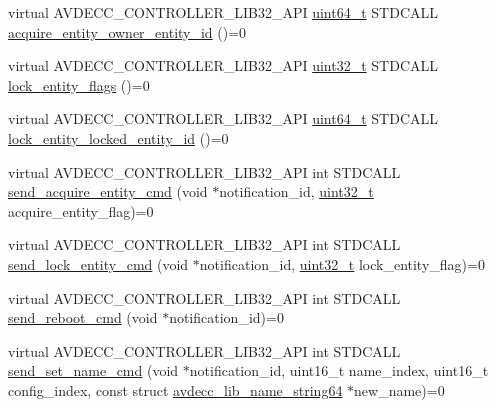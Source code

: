 \begin{DoxyCompactItemize}
\item 
virtual A\+V\+D\+E\+C\+C\+\_\+\+C\+O\+N\+T\+R\+O\+L\+L\+E\+R\+\_\+\+L\+I\+B32\+\_\+\+A\+PI \hyperlink{parse_8c_aec6fcb673ff035718c238c8c9d544c47}{uint64\+\_\+t} S\+T\+D\+C\+A\+LL \hyperlink{classavdecc__lib_1_1descriptor__base_a6480d803970d505ce7a9b429a6eb71bd}{acquire\+\_\+entity\+\_\+owner\+\_\+entity\+\_\+id} ()=0
\item 
virtual A\+V\+D\+E\+C\+C\+\_\+\+C\+O\+N\+T\+R\+O\+L\+L\+E\+R\+\_\+\+L\+I\+B32\+\_\+\+A\+PI \hyperlink{parse_8c_a6eb1e68cc391dd753bc8ce896dbb8315}{uint32\+\_\+t} S\+T\+D\+C\+A\+LL \hyperlink{classavdecc__lib_1_1descriptor__base_a757e66272bba4c52cefa914df8c60bb5}{lock\+\_\+entity\+\_\+flags} ()=0
\item 
virtual A\+V\+D\+E\+C\+C\+\_\+\+C\+O\+N\+T\+R\+O\+L\+L\+E\+R\+\_\+\+L\+I\+B32\+\_\+\+A\+PI \hyperlink{parse_8c_aec6fcb673ff035718c238c8c9d544c47}{uint64\+\_\+t} S\+T\+D\+C\+A\+LL \hyperlink{classavdecc__lib_1_1descriptor__base_a052b47529d0e60ca87894159fcb65e14}{lock\+\_\+entity\+\_\+locked\+\_\+entity\+\_\+id} ()=0
\item 
virtual A\+V\+D\+E\+C\+C\+\_\+\+C\+O\+N\+T\+R\+O\+L\+L\+E\+R\+\_\+\+L\+I\+B32\+\_\+\+A\+PI int S\+T\+D\+C\+A\+LL \hyperlink{classavdecc__lib_1_1descriptor__base_adfd0cf2a51bff7d762b0efc743480c48}{send\+\_\+acquire\+\_\+entity\+\_\+cmd} (void $\ast$notification\+\_\+id, \hyperlink{parse_8c_a6eb1e68cc391dd753bc8ce896dbb8315}{uint32\+\_\+t} acquire\+\_\+entity\+\_\+flag)=0
\item 
virtual A\+V\+D\+E\+C\+C\+\_\+\+C\+O\+N\+T\+R\+O\+L\+L\+E\+R\+\_\+\+L\+I\+B32\+\_\+\+A\+PI int S\+T\+D\+C\+A\+LL \hyperlink{classavdecc__lib_1_1descriptor__base_a1ac1f5c700f4eebd37b7c45498b36bbc}{send\+\_\+lock\+\_\+entity\+\_\+cmd} (void $\ast$notification\+\_\+id, \hyperlink{parse_8c_a6eb1e68cc391dd753bc8ce896dbb8315}{uint32\+\_\+t} lock\+\_\+entity\+\_\+flag)=0
\item 
virtual A\+V\+D\+E\+C\+C\+\_\+\+C\+O\+N\+T\+R\+O\+L\+L\+E\+R\+\_\+\+L\+I\+B32\+\_\+\+A\+PI int S\+T\+D\+C\+A\+LL \hyperlink{classavdecc__lib_1_1descriptor__base_a1618412a9b3d57a12044030b31cfd5a3}{send\+\_\+reboot\+\_\+cmd} (void $\ast$notification\+\_\+id)=0
\item 
virtual A\+V\+D\+E\+C\+C\+\_\+\+C\+O\+N\+T\+R\+O\+L\+L\+E\+R\+\_\+\+L\+I\+B32\+\_\+\+A\+PI int S\+T\+D\+C\+A\+LL \hyperlink{classavdecc__lib_1_1descriptor__base_a6a8c227d7a202f251c689107df7ede0b}{send\+\_\+set\+\_\+name\+\_\+cmd} (void $\ast$notification\+\_\+id, uint16\+\_\+t name\+\_\+index, uint16\+\_\+t config\+\_\+index, const struct \hyperlink{structavdecc__lib_1_1avdecc__lib__name__string64}{avdecc\+\_\+lib\+\_\+name\+\_\+string64} $\ast$new\+\_\+name)=0

\end{DoxyCompactItemize}
